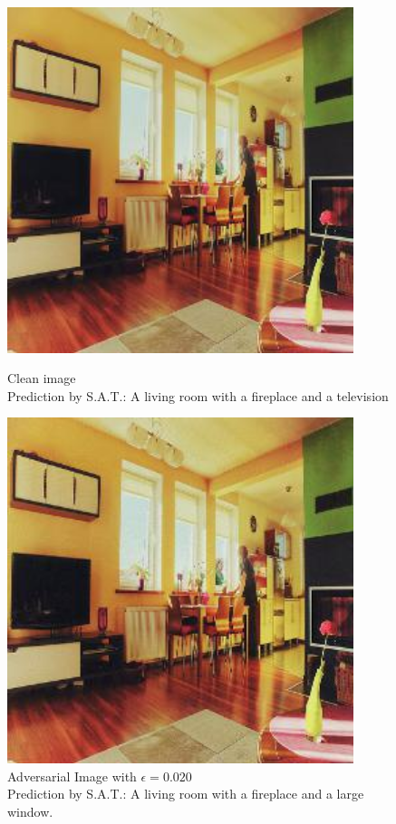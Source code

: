 \begin{figure}[ht]
    \centering
    \begin{minipage}{0.45\textwidth}
        \centering
        \includegraphics[width=0.9\textwidth]{../code/ShowDistractAndDeceive/samples/0.000/img_0.jpg} %
        \caption*{Clean image\\Prediction by S.A.T.: A living room with a fireplace and a television}
    \end{minipage}\hfill
    \begin{minipage}{0.45\textwidth}
        \centering
        \includegraphics[width=0.9\textwidth]{../code/ShowDistractAndDeceive/samples/0.020/img_0.jpg} %
        \caption*{Adversarial Image with $\epsilon=0.020$\\Prediction by S.A.T.: A living room with a fireplace and a large window.}
    \end{minipage}
\end{figure}

